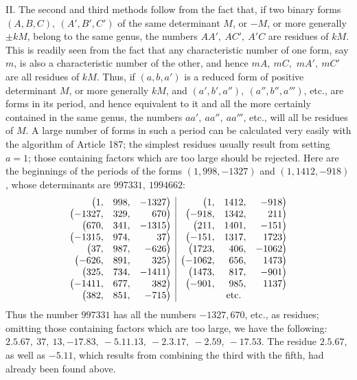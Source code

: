 \begin{samepage}
II. The second and third methods follow from the fact that, if two binary forms \((A,\allowbreak B,\allowbreak C),\allowbreak \ (A',\allowbreak B',\allowbreak C')\) of the same determinant \(M\), or \(-M\), or more generally \(\pm kM\), belong to the same genus, the numbers \(AA',\allowbreak \ AC',\allowbreak \ A'C\) are residues of \(kM\). This is readily seen from the fact that any characteristic number of one form, say \(m\), is also a characteristic number of the other, and hence \(mA,\allowbreak \ mC,\allowbreak \)
\(mA',\allowbreak \ mC'\) are all residues of \(kM\). Thus, if \((a,\allowbreak b,\allowbreak a')\) is a reduced form of positive determinant \(M\), or more generally \(kM\), and \((a',\allowbreak b',\allowbreak a''),\allowbreak \ (a'',\allowbreak b'',\allowbreak a''')\), etc., are forms in its period, and hence equivalent to it and all the more certainly contained in the same genus, the numbers \(aa',\allowbreak \ aa'',\allowbreak \ aa'''\), etc., will all be residues of \(M\). A large number of forms in such a period can be calculated very easily with the algorithm of Article 187; the simplest residues usually result from setting \(a=1\); those containing factors which are too large should be rejected. Here are the beginnings of the periods of the forms \((1,\allowbreak 998,\allowbreak -1327)\) and \((1,\allowbreak 1412,\allowbreak -918)\), whose determinants are \(997331,\allowbreak \ 1994662\): \[\begin{array}{rrr|rrr}\bigl(1,&998,&-1327\bigr)&\bigl(1,&1412,&-918\bigr)\\ \bigl(-1327,&329,&670\bigr)&\bigl(-918,&1342,&211\bigr)\\ \bigl(670,&341,&-1315\bigr)&\bigl(211,&1401,&-151\bigr)\\ \bigl(-1315,&974,&37\bigr)&\bigl(-151,&1317,&1723\bigr)\\ \bigl(37,&987,&-626\bigr)&\bigl(1723,&406,&-1062\bigr)\\ \bigl(-626,&891,&325\bigr)&\bigl(-1062,&656,&1473\bigr)\\ \bigl(325,&734,&-1411\bigr)&\bigl(1473,&817,&-901\bigr)\\ \bigl(-1411,&677,&382\bigr)&\bigl(-901,&985,&1137\bigr)\\ \bigl(382,&851,&-715\bigr)&\multicolumn{3}{c}{\mathrm{etc.}}\end{array}\] Thus the number \(997331\) has all the numbers \(-1327,\allowbreak 670\), etc., as residues; omitting those containing factors which are too large, we have the following: \(2.5.67,\allowbreak \ 37,\allowbreak \ 13,\allowbreak -17.83,\allowbreak \ -5.11.13,\allowbreak \ -2.3.17,\allowbreak \ -2.59,\allowbreak \ -17.53\). The residue \(2.5.67\), as well as \(-5.11\), which results from combining the third with the fifth, had already been found above.
\par\end{samepage}

